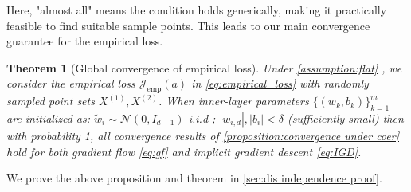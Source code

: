\documentclass{article}
\newtheorem{theorem}{Theorem}
\begin{document}
Here, "almost all" means the condition holds generically, making it practically feasible to find suitable sample points.
This leads to our main convergence guarantee for the empirical loss.

\begin{theorem}[Global convergence of empirical loss]\label{thm:global_convergence_emp}
Under \cref{assumption:flat} , we consider the empirical loss \(\mathcal{J}_{\text{emp}}(a)\) in \eqref{eq:empirical_loss} with randomly sampled point sets \(X^{(1)}, X^{(2)}\). When inner-layer parameters \(\{(w_k,b_k)\}_{k=1}^m\) are initialized as:
\(\tilde{w}_i \sim \mathcal{N}(0,I_{d-1})\) i.i.d ;  \(|w_{i,d}|, |b_i| < \delta\) (sufficiently small)
then with probability 1, all convergence results of \cref{proposition:convergence under coer} hold for both gradient flow \eqref{eq:gf} and implicit gradient descent \eqref{eq:IGD}.
\end{theorem}
We prove the above proposition and theorem in \cref{sec:dis independence proof}.
\end{document}
